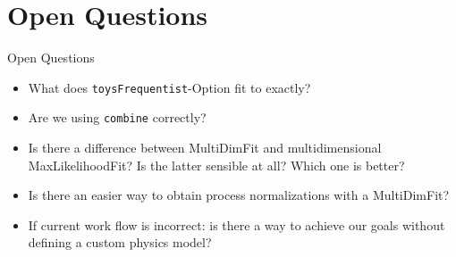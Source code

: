 \section{Open Questions}
\begin{frame}{Open Questions}
\begin{itemize}
\item What does \texttt{toysFrequentist}-Option fit to exactly?\\
\item Are we using \texttt{combine} correctly?
\item Is there a difference between MultiDimFit and multidimensional MaxLikelihoodFit? Is the latter sensible at all? Which one is better?
\item Is there an easier way to obtain process normalizations with a MultiDimFit?
\item If current work flow is incorrect: is there a way to achieve our goals without defining a custom physics model?
\end{itemize}
\end{frame}
